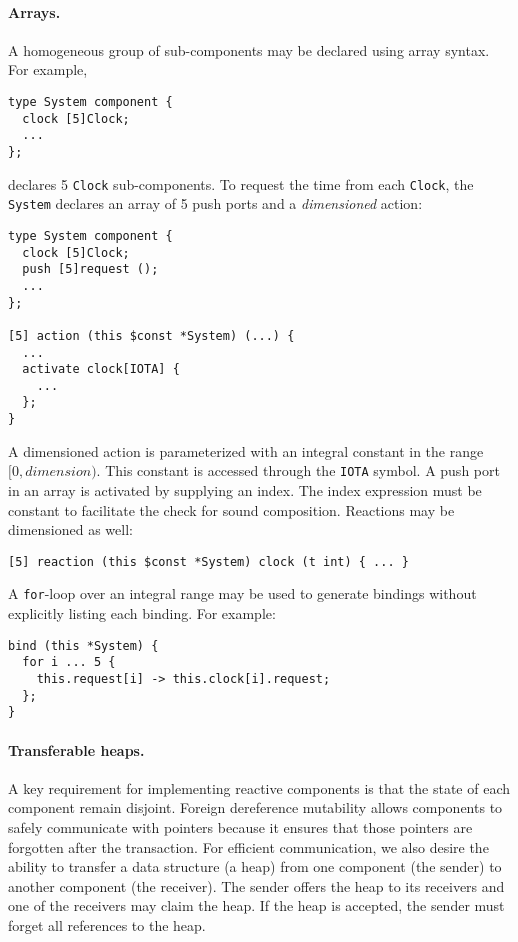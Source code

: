 \paragraph{Arrays.}
A homogeneous group of sub-components may be declared using array syntax.
For example,
\begin{verbatim}
type System component {
  clock [5]Clock;
  ...
};
\end{verbatim}
declares 5 \verb+Clock+ sub-components.
To request the time from each \verb+Clock+, the \verb+System+ declares an array of 5 push ports and a \emph{dimensioned} action:
\begin{verbatim}
type System component {
  clock [5]Clock;
  push [5]request ();
  ...
};

[5] action (this $const *System) (...) {
  ...
  activate clock[IOTA] {
    ...
  };
}
\end{verbatim}
A dimensioned action is parameterized with an integral constant in the range $[0,dimension)$.
This constant is accessed through the \verb+IOTA+ symbol.
A push port in an array is activated by supplying an index.
The index expression must be constant to facilitate the check for sound composition.
Reactions may be dimensioned as well:
\begin{verbatim}
[5] reaction (this $const *System) clock (t int) { ... }
\end{verbatim}
A \verb+for+-loop over an integral range may be used to generate bindings without explicitly listing each binding.
For example:
\begin{verbatim}
bind (this *System) {
  for i ... 5 {
    this.request[i] -> this.clock[i].request;
  };
}
\end{verbatim}

\paragraph{Transferable heaps.}
A key requirement for implementing reactive components is that the state of each component remain disjoint.
Foreign dereference mutability allows components to safely communicate with pointers because it ensures that those pointers are forgotten after the transaction.
For efficient communication, we also desire the ability to transfer a data structure (a heap) from one component (the sender) to another component (the receiver).
The sender offers the heap to its receivers and one of the receivers may claim the heap.
If the heap is accepted, the sender must forget all references to the heap.

